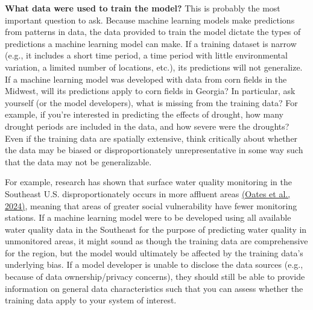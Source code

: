 \documentclass[
]{book}
\begin{document}
\textbf{What data were used to train the model?}
This is probably the most important question to ask. Because machine learning models make predictions from patterns in data, the data provided to train the model dictate the types of predictions a machine learning model can make. If a training dataset is narrow (e.g., it includes a short time period, a time period with little environmental variation, a limited number of locations, etc.), its predictions will not generalize. If a machine learning model was developed with data from corn fields in the Midwest, will its predictions apply to corn fields in Georgia? In particular, ask yourself (or the model developers), what is missing from the training data? For example, if you're interested in predicting the effects of drought, how many drought periods are included in the data, and how severe were the droughts? Even if the training data are spatially extensive, think critically about whether the data may be biased or disproportionately unrepresentative in some way such that the data may not be generalizable.

For example, research has shown that surface water quality monitoring in the Southeast U.S. disproportionately occurs in more affluent areas \href{https://doi.org/10.22541/essoar.172191636.66550095/v2}{(Oates et al., 2024)}, meaning that areas of greater social vulnerability have fewer monitoring stations. If a machine learning model were to be developed using all available water quality data in the Southeast for the purpose of predicting water quality in unmonitored areas, it might sound as though the training data are comprehensive for the region, but the model would ultimately be affected by the training data's underlying bias. If a model developer is unable to disclose the data sources (e.g., because of data ownership/privacy concerns), they should still be able to provide information on general data characteristics such that you can assess whether the training data apply to your system of interest.
\end{document}
